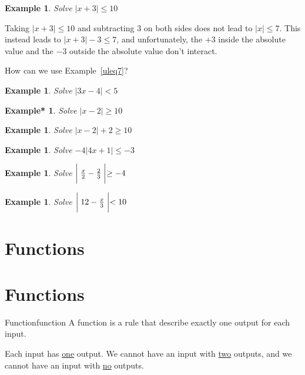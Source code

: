 \documentclass[twoside]{tufte-handout}
\newcommand{\booksection}{0}
\newcommand{\pageheader}{}
\newcounter{ekcounter}%
\theoremstyle{ekimcustom}
\newtheorem{exm}[ekcounter]{Example}
\newtheorem{exmref}[ekcounter]{Example*}
\begin{document}
\begin{exm}{}Solve  $|x + 3| \leq 10$
\end{exm}
\begin{bwarning}{}{}
Taking $|x + 3| \leq 10$ and subtracting $3$ on both sides does not lead to $|x| \leq 7$. This instead leads to $|x + 3|-3 \leq 7$, and unfortunately, the $+3$ inside the absolute value and the $-3$ outside the absolute value don't interact.
\end{bwarning}
How can we use Example~\ref{uleq7}?
\vskip10pt




\begin{exm}{}Solve  $|3x-4|<5$
\end{exm}\vskip10pt

\begin{exmref}\label{absx2geq10}Solve  $|x-2| \geq 10$
\end{exmref}\vskip10pt

\everymath{\displaystyle}
\begin{exm}{}Solve  $|x-2| + 2 \geq 10$
\end{exm}\vskip10pt

\begin{exm}{}Solve  $-4|4x+1|\leq -3$
\end{exm}\vskip10pt

\everymath{\displaystyle}
\begin{exm}{}Solve  $\biggm|\frac{x}{2}-\frac{2}{3}\biggm|\geq -4$
\end{exm}\vskip10pt

\begin{exm}{}Solve  $\biggm|12-\frac{x}{3}\biggm|< 10$
\end{exm}\vskip10pt







\renewcommand{\booksection}{Functions}
\renewcommand{\pageheader}{\booksection }
\section*{\LARGE \pageheader}

\section{Functions }

\begin{bdefinition}{Function}{function}
A function is a rule that describe exactly one output for each input.
\end{bdefinition}
Each input has \underline{one} output. We cannot have an input with \underline{two} outputs, and we cannot have an input with \underline{no} outputs.
\end{document}
